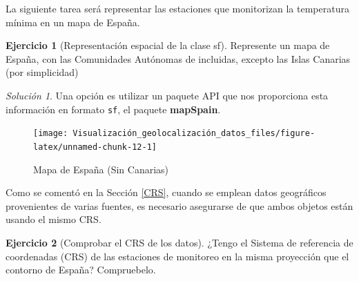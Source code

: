 \documentclass[
]{book}
\newenvironment{Shaded}{\begin{snugshade}}{\end{snugshade}}
\newcommand{\CommentTok}[1]{\textcolor[rgb]{0.56,0.35,0.01}{\textit{#1}}}
\newcommand{\FunctionTok}[1]{\textcolor[rgb]{0.00,0.00,0.00}{#1}}
\newcommand{\NormalTok}[1]{#1}
\newcommand{\OtherTok}[1]{\textcolor[rgb]{0.56,0.35,0.01}{#1}}
\newcommand{\SpecialCharTok}[1]{\textcolor[rgb]{0.00,0.00,0.00}{#1}}
\newcommand{\StringTok}[1]{\textcolor[rgb]{0.31,0.60,0.02}{#1}}
\theoremstyle{definition}
\theoremstyle{definition}
\theoremstyle{definition}
\newtheorem{exercise}{Ejercicio}[chapter]
\theoremstyle{definition}
\theoremstyle{remark}
\newtheorem*{solution}{Solución}
\begin{document}
La siguiente tarea será representar las estaciones que monitorizan la
temperatura mínima en un mapa de España.

\begin{exercise}[Representación espacial de la clase sf]
\protect\hypertarget{exr:ex6}{}\label{exr:ex6}Represente un mapa de España, con las Comunidades Autónomas de incluidas,
excepto las Islas Canarias (por simplicidad)
\end{exercise}

\begin{solution}
Una opción es utilizar un paquete API que nos proporciona esta información en
formato \texttt{sf}, el paquete \textbf{mapSpain}.
\end{solution}

\begin{Shaded}
\end{Shaded}

\begin{figure}

{\centering \texttt{[image: Visualización\_geolocalización\_datos\_files/figure-latex/unnamed-chunk-12-1]} 

}

\caption{Mapa de España (Sin Canarias)}\label{fig:unnamed-chunk-12}
\end{figure}

Como se comentó en la Sección \ref{CRS}, cuando se emplean datos geográficos
provenientes de varias fuentes, es necesario asegurarse de que ambos objetos
están usando el mismo CRS.

\begin{exercise}[Comprobar el CRS de los datos]
\protect\hypertarget{exr:ex7}{}\label{exr:ex7}¿Tengo el Sistema de referencia de coordenadas (CRS) de las estaciones de
monitoreo en la misma proyección que el contorno de España? Compruebelo.
\end{exercise}
\end{document}
